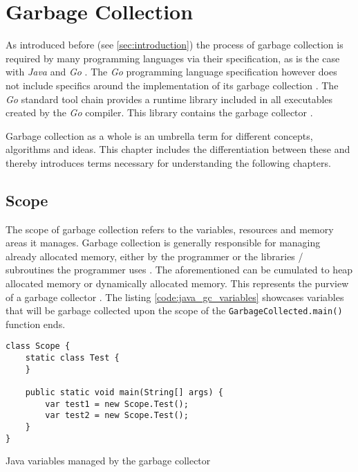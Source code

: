 \chapter{Garbage Collection}
\label{sec:overview}

As introduced before (see \autoref{sec:introduction}) the process of garbage
collection is required by many programming languages via their specification,
as is the case with \textit{Java} \cite[Chapter 1.
Introduction]{java_language_spec_2023} and \textit{Go}
\cite[Introduction]{go_spec_2023}. The \textit{Go} programming language
specification however does not include specifics around the implementation of
its garbage collection \cite[Introduction]{go_gcguide_2022}. The \textit{Go}
standard tool chain provides a runtime library included in all executables
created by the \textit{Go} compiler. This library contains the garbage
collector \cite[Introduction]{go_gcguide_2022}.

Garbage collection as a whole is an umbrella term for
different concepts, algorithms and ideas. This chapter includes the
differentiation between these and thereby introduces terms necessary for
understanding the following chapters. 

\section{Scope}
\label{sec:scope}

The scope of garbage collection refers to the variables, resources and memory
areas it manages. Garbage collection is generally responsible for managing
already allocated memory, either by the programmer or the libraries /
subroutines the programmer uses \cite[Abstract]{learned-gc_2020}. The
aforementioned can be cumulated to heap allocated memory or dynamically
allocated memory. This represents the purview of a garbage collector \cite[1
Introduction]{age-based-gc_1999}. The listing \autoref{code:java_gc_variables}
showcases variables that will be garbage collected upon the scope of the
\texttt{GarbageCollected.main()} function ends.

\begin{listing}[H] 
    \begin{verbatim} 
class Scope {
    static class Test {
    }

    public static void main(String[] args) {
        var test1 = new Scope.Test();
        var test2 = new Scope.Test();
    }
}
    \end{verbatim}
    \caption{Java variables managed by the garbage collector}
    \label{code:java_gc_variables}
\end{listing}

